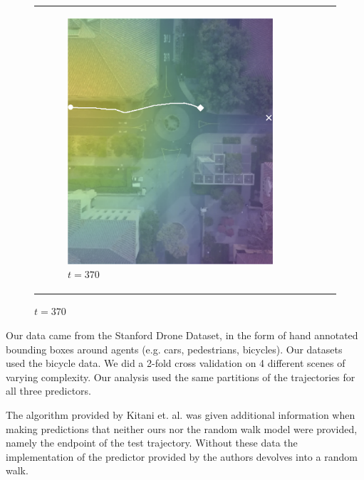 \documentclass[conference]{IEEEtran}
\begin{document}
\begin{figure}
\begin{tabular}{M{.1\linewidth}  M{.3\linewidth} M{.3\linewidth}  M{.3\linewidth}}
	\begin{subfigure}[b]{\linewidth} \includegraphics[width=\linewidth]{./figures/comparison/rand_death_1_2_t=370.png}
		\caption{$t=370$}
	\end{subfigure}
	\label{fig:death-1-2}
	
	\end{tabular}
\end{figure}





Our data came from the Stanford Drone Dataset, in the form of hand annotated bounding boxes around agents (e.g. cars, pedestrians, bicycles). Our datasets used the bicycle data. We did a 2-fold cross validation on 4 different scenes of varying complexity. Our analysis used the same partitions of the trajectories for all three predictors.

The algorithm provided by Kitani et. al. was given additional information when making predictions that neither ours nor the random walk model were provided, namely the endpoint of the test trajectory. Without these data the implementation of the predictor provided by the authors devolves into a random walk.
\end{document}
